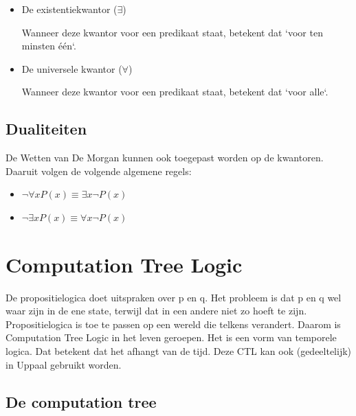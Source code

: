 \documentclass{article}
\begin{document}
		\begin{itemize}
			\item De existentiekwantor (\( \exists \))

			Wanneer deze kwantor voor een predikaat staat, betekent dat `voor ten minsten één`.

			\item De universele kwantor (\( \forall \))

			Wanneer deze kwantor voor een predikaat staat, betekent dat `voor alle`.
		\end{itemize}

		
		\subsection{Dualiteiten}
		
		De Wetten van De Morgan kunnen ook toegepast worden op de kwantoren. Daaruit volgen de volgende algemene regels:

		\begin{itemize}
			\item \( \neg \forall xP(x) \equiv \exists x \neg P(x) \)
			\item \( \neg \exists xP(x) \equiv \forall x \neg P(x) \)
		\end{itemize}
	
	\newpage
	
	
	\section{Computation Tree Logic}
	
	De propositielogica doet uitspraken over p en q. Het probleem is dat p en q wel waar zijn in de ene state, terwijl dat in een andere niet zo hoeft te zijn. Propositielogica is toe te passen op een wereld die telkens verandert. Daarom is Computation Tree Logic in het leven geroepen. Het is een vorm van temporele logica. Dat betekent dat het afhangt van de tijd. Deze CTL kan ook (gedeeltelijk) in Uppaal gebruikt worden.
		
		\subsection{De computation tree}
		
\end{document}
